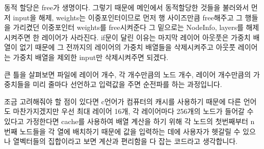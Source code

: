 \documentclass[12pt,a4paper]{article}
\begin{document}
동적 할당은 free가 생명이다.
그렇기 때문에 메인에서 동적할당한 것들을 불러와서
먼저 input을 해제, weights는 이중포인터이므로
먼저 행 사이즈만큼 free해주고 그 행들을 가리켰던 이중포인터 weights를 free시켜준다
그 밑으로는 NodeInfo, layers를 해제시켜주면 한 레이어가 사라진다.
if문이 달린 이유는 마지막 레이어 아웃풋은 가중치 배열이 없기 때문에
그 전까지의 레이어의 가중치 배열들을 삭제시켜주고
아웃풋 레이어는 가중치 배열을 제외한 input만 삭제시켜주면 되겠다.

큰 틀을 살펴보면 파일에 
레이어 개수, 각 개수만큼의 노드 개수, 레이어 개수만큼의 가중치들을 미리 줄마다 선언하고
입력값을 주면 순전파를 하는 과정입니다.

조금 고려해줘야 할 점이 있다면 c언어가 컴퓨터의 캐시를 사용하기 때문에
다른 언어도 마찬가지겠지만 우선 최대 레이어 16개, 각 레이어마다 256개의 노드가
들어갈 수 있다고 가정한다면
cache를 사용하여 배열 계산을 하기 위해
각 노드의 첫번째부터 n번째 노드들을 각 열에 배치하기 때문에 값을 입력하는 데에
사용자가 헷갈릴 수 있으나 열벡터들의 집합이라고 보면
계산과 편리함을 다 잡는 코드라고 생각합니다.
\end{document}
